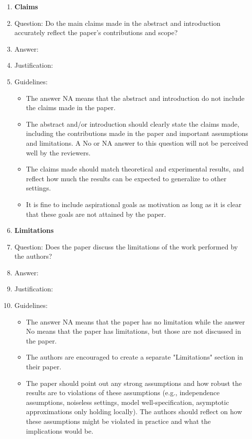 \documentclass{article}
\begin{document}
\begin{enumerate}
    \item {\bf Claims}
    \item[] Question: Do the main claims made in the abstract and introduction accurately reflect the paper's contributions and scope?
    \item[] Answer: \answerTODO{} %
    \item[] Justification: \justificationTODO{}
    \item[] Guidelines:
        \begin{itemize}
            \item The answer NA means that the abstract and introduction do not include the claims made in the paper.
            \item The abstract and/or introduction should clearly state the claims made, including the contributions made in the paper and important assumptions and limitations. A No or NA answer to this question will not be perceived well by the reviewers.
            \item The claims made should match theoretical and experimental results, and reflect how much the results can be expected to generalize to other settings.
            \item It is fine to include aspirational goals as motivation as long as it is clear that these goals are not attained by the paper.
        \end{itemize}
    \item {\bf Limitations}
    \item[] Question: Does the paper discuss the limitations of the work performed by the authors?
    \item[] Answer: \answerTODO{} %
    \item[] Justification: \justificationTODO{}
    \item[] Guidelines:
        \begin{itemize}
            \item The answer NA means that the paper has no limitation while the answer No means that the paper has limitations, but those are not discussed in the paper.
            \item The authors are encouraged to create a separate "Limitations" section in their paper.
            \item The paper should point out any strong assumptions and how robust the results are to violations of these assumptions (e.g., independence assumptions, noiseless settings, model well-specification, asymptotic approximations only holding locally). The authors should reflect on how these assumptions might be violated in practice and what the implications would be.

\end{itemize}
\end{enumerate}
\end{document}
